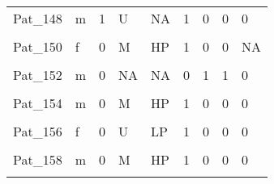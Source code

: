 \documentclass[11pt, a4paper, twosided]{book}
\begin{document}
\begin{longtable}[t]{l|l|r|l|l|l|l|l|l}
\cellcolor[HTML]{E2E868}{Pat\_147} & \cellcolor[HTML]{E2E868}{m} & \cellcolor[HTML]{E2E868}{1} & \cellcolor[HTML]{E2E868}{U} & \cellcolor[HTML]{E2E868}{LP} & \cellcolor[HTML]{E2E868}{0} & \cellcolor[HTML]{E2E868}{0} & \cellcolor[HTML]{E2E868}{0} & \cellcolor[HTML]{E2E868}{1}\\
\hline
Pat\_148 & m & 1 & U & NA & 1 & 0 & 0 & 0\\
\hline
\cellcolor[HTML]{E2E868}{Pat\_149} & \cellcolor[HTML]{E2E868}{m} & \cellcolor[HTML]{E2E868}{1} & \cellcolor[HTML]{E2E868}{U} & \cellcolor[HTML]{E2E868}{LP} & \cellcolor[HTML]{E2E868}{0} & \cellcolor[HTML]{E2E868}{1} & \cellcolor[HTML]{E2E868}{1} & \cellcolor[HTML]{E2E868}{0}\\
\hline
Pat\_150 & f & 0 & M & HP & 1 & 0 & 0 & NA\\
\hline
\cellcolor[HTML]{E2E868}{Pat\_151} & \cellcolor[HTML]{E2E868}{m} & \cellcolor[HTML]{E2E868}{0} & \cellcolor[HTML]{E2E868}{U} & \cellcolor[HTML]{E2E868}{LP} & \cellcolor[HTML]{E2E868}{0} & \cellcolor[HTML]{E2E868}{0} & \cellcolor[HTML]{E2E868}{1} & \cellcolor[HTML]{E2E868}{0}\\
\hline
Pat\_152 & m & 0 & NA & NA & 0 & 1 & 1 & 0\\
\hline
\cellcolor[HTML]{E2E868}{Pat\_153} & \cellcolor[HTML]{E2E868}{m} & \cellcolor[HTML]{E2E868}{1} & \cellcolor[HTML]{E2E868}{U} & \cellcolor[HTML]{E2E868}{LP} & \cellcolor[HTML]{E2E868}{1} & \cellcolor[HTML]{E2E868}{0} & \cellcolor[HTML]{E2E868}{0} & \cellcolor[HTML]{E2E868}{0}\\
\hline
Pat\_154 & m & 0 & M & HP & 1 & 0 & 0 & 0\\
\hline
\cellcolor[HTML]{E2E868}{Pat\_155} & \cellcolor[HTML]{E2E868}{m} & \cellcolor[HTML]{E2E868}{0} & \cellcolor[HTML]{E2E868}{M} & \cellcolor[HTML]{E2E868}{HP} & \cellcolor[HTML]{E2E868}{1} & \cellcolor[HTML]{E2E868}{0} & \cellcolor[HTML]{E2E868}{0} & \cellcolor[HTML]{E2E868}{0}\\
\hline
Pat\_156 & f & 0 & U & LP & 1 & 0 & 0 & 0\\
\hline
\cellcolor[HTML]{E2E868}{Pat\_157} & \cellcolor[HTML]{E2E868}{f} & \cellcolor[HTML]{E2E868}{0} & \cellcolor[HTML]{E2E868}{U} & \cellcolor[HTML]{E2E868}{LP} & \cellcolor[HTML]{E2E868}{1} & \cellcolor[HTML]{E2E868}{1} & \cellcolor[HTML]{E2E868}{0} & \cellcolor[HTML]{E2E868}{0}\\
\hline
Pat\_158 & m & 0 & M & HP & 1 & 0 & 0 & 0\\
\hline
\cellcolor[HTML]{E2E868}{Pat\_159} & \cellcolor[HTML]{E2E868}{f} & \cellcolor[HTML]{E2E868}{0} & \cellcolor[HTML]{E2E868}{U} & \cellcolor[HTML]{E2E868}{LP} & \cellcolor[HTML]{E2E868}{1} & \cellcolor[HTML]{E2E868}{0} & \cellcolor[HTML]{E2E868}{0} & \cellcolor[HTML]{E2E868}{0}\\

\end{longtable}
\end{document}
